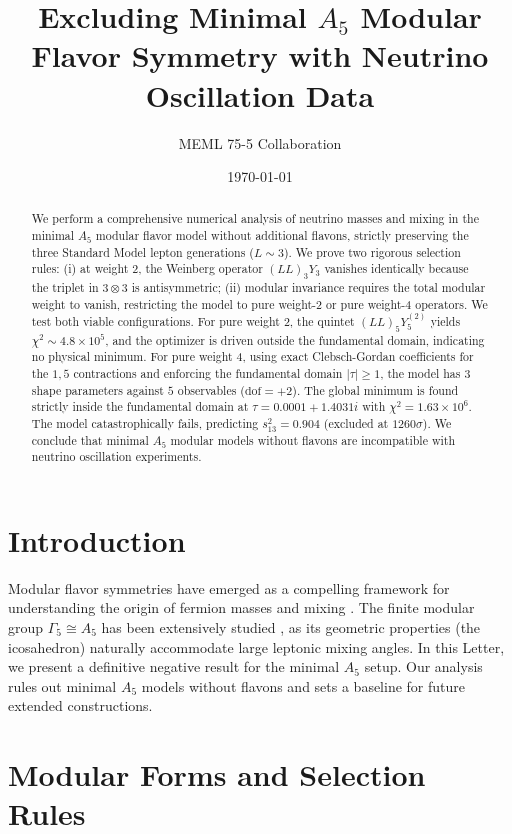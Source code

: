 \documentclass[11pt, a4paper]{article}
\title{\textbf{Excluding Minimal \(A_5\) Modular Flavor Symmetry with Neutrino Oscillation Data}}
\author{MEML 75-5 Collaboration}
\date{\today}
\begin{document}
\maketitle

\begin{abstract}
We perform a comprehensive numerical analysis of neutrino masses and mixing in the minimal \(A_5\) modular flavor model without additional flavons, strictly preserving the three Standard Model lepton generations (\(L \sim 3\)). We prove two rigorous selection rules: (i) at weight 2, the Weinberg operator \((LL)_3 Y_3\) vanishes identically because the triplet in \(3 \otimes 3\) is antisymmetric; (ii) modular invariance requires the total modular weight to vanish, restricting the model to pure weight-2 or pure weight-4 operators. We test both viable configurations. For pure weight 2, the quintet \((LL)_5 Y_5^{(2)}\) yields \(\chi^2 \sim 4.8\times 10^5\), and the optimizer is driven outside the fundamental domain, indicating no physical minimum. For pure weight 4, using exact Clebsch-Gordan coefficients for the \(1, 5\) contractions and enforcing the fundamental domain \(|\tau|\ge 1\), the model has \(3\) shape parameters against \(5\) observables (\(\mathrm{dof}=+2\)). The global minimum is found strictly inside the fundamental domain at \(\tau = 0.0001 + 1.4031 i\) with \(\chi^2 = 1.63 \times 10^6\). The model catastrophically fails, predicting \(s_{13}^2 = 0.904\) (excluded at \(1260\sigma\)). We conclude that minimal \(A_5\) modular models without flavons are incompatible with neutrino oscillation experiments.
\end{abstract}

\section{Introduction}
Modular flavor symmetries have emerged as a compelling framework for understanding the origin of fermion masses and mixing \cite{Feruglio:2017}. The finite modular group \(\Gamma_5 \cong A_5\) has been extensively studied \cite{Ding:2019, Novichkov:2018}, as its geometric properties (the icosahedron) naturally accommodate large leptonic mixing angles. In this Letter, we present a definitive negative result for the minimal \(A_5\) setup. Our analysis rules out minimal \(A_5\) models without flavons and sets a baseline for future extended constructions.

\section{Modular Forms and Selection Rules}
\end{document}
